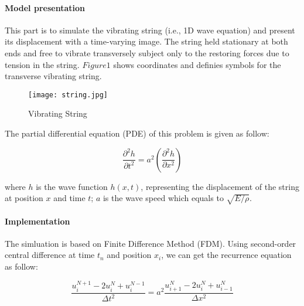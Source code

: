 

\paragraph{Model presentation}
This part is to simulate the vibrating string (i.e., 1D wave equation) and present its displacement with a time-varying image. The string held stationary at both ends and free to vibrate transversely subject only to the restoring forces due to tension in the string. $Figure 1$ shows coordinates and definies symbols for the transverse vibrating string. 

\begin{figure}[htb]
	\centering
	\texttt{[image: string.jpg]}       
	\caption{Vibrating String}
\end{figure}

The partial differential equation (PDE) of this problem is given as follow:

\begin{equation}
	\frac{\partial^2 h}{\partial t^2}=a^2\left(\frac{\partial^2 h}{\partial x^2}\right)
\end{equation}

where $h$ is the wave function $h(x,t)$, representing the displacement of the string at position $x$ and time $t$; $a$ is the wave speed which equals to $\sqrt{E/\rho}$.

\paragraph{Implementation}

The simluation is based on Finite Difference Method (FDM). Using second-order central difference at time $t_n$ and position $x_i$, we can get the recurrence equation as follow:

\begin{equation}
\frac{u_{i}^{N+1}-2u_{i}^{N}+u_{i}^{N-1}}{\Delta t^2} = a^2\frac{u_{i+1}^{N}-2u_{i}^{N}+u_{i-1}^{N}}{\Delta x^2}
\end{equation}

